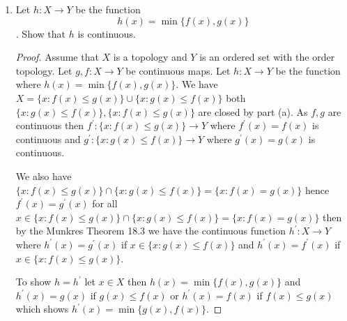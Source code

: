 \documentclass{amsart}
\theoremstyle{plain}
\theoremstyle{definition}
\theoremstyle{remark}
\begin{document}
\begin{enumerate}
\begin{proof}
\begin{enumerate}
            \[
                f^{-1}((g(x),f(x)])\cup g^{-1}((c,f(x)))\subset \{x:f(x)> g(x)\}
            \]
            \item If there is some $y\in Y$ where $f(x)>y> g(x)$ and without loss of generality $f(x)=\max (Y)$ and $g(x)\not =\min (Y)$ then we have the neighborhoods $f(x)\in (y, f(x)]$ and $g(x)\in (b,y)$ where $b\in Y$ with $b<g(x)$ then 
            \[
                f^{-1}((y,f(x)])\cup g^{-1}((b,y))\subset \{x:f(x)>g(x)\}
            \]
        
        \end{enumerate}
        Hence for all $x\in \{x: f(x)>g(x)\}$ we have the existence of two open sets $U,V$ in $Y$ with $x\in f^{-1}(U)\cup g^{-1}(V)\subset \{x: f(x)>g(x)\}$ then we get 
        \[
            \bigcup_{x\in \{x: f(x)>g(x)\}}f^{-1}(U_x)\cup g^{-1}(V_x)= \{x: f(x)>g(x)\}
        \]
        This implies that $\{x:f(x)>g(x)\}$ is open which implies that $\{x:f(x)\leq g(x)\}$ is closed. 
    \end{proof}


    \item Let $h:X\to Y$ be the function \[ h(x)=\min \{f(x),g(x)\}\]. Show that $h$ is continuous. 
    \begin{proof}
    Assume that $X$ is a topology and $Y$ is an ordered set with the order topology. Let $g,f:X\to Y$ be continuous maps. Let $h:X\to Y$ be the function where $h(x)=\min \{f(x),g(x)\}$. 
    We have $X=\{x:f(x)\leq g(x)\}\cup \{x: g(x)\leq f(x)\}$ both $\{x: g(x)\leq f(x)\},\{x:f(x)\leq g(x)\}$ are closed by part (a). As $f,g$ are continuous then $f^\prime:\{x:f(x)\leq g(x)\}\to Y $ where $f^\prime(x)=f(x)$ is continuous and $g^\prime :\{x: g(x)\leq f(x)\}\to Y$ where $g^{\prime}(x)=g(x)$ is continuous.
    
    We also have $\{x:f(x)\leq g(x)\}\cap \{x: g(x)\leq f(x)\}=\{x: f(x)=g(x)\}$ hence $f^\prime(x)=g^\prime(x)$ for all $x\in \{x:f(x)\leq g(x)\}\cap \{x: g(x)\leq f(x)\}=\{x: f(x)=g(x)\}$ then by the Munkres Theorem 18.3 we have the continuous function $h^\prime: X\to Y$ where $h^\prime(x)=g^\prime(x)$ if $x\in \{x: g(x)\leq f(x)\}$ and $h^\prime(x)=f^\prime(x)$ if $x\in \{x: f(x)\leq g(x)\}$. 

    To show $h=h^\prime$ let $x\in X$ then $h(x)=\min\{f(x),g(x)\}$ and $h^\prime(x)=g(x)$ if $g(x)\leq f(x)$ or $h^\prime (x)=f(x)$ if $f(x)\leq g(x)$ which shows $h^\prime(x) = \min \{g(x),f(x)\}$.
    \end{proof}
\end{enumerate}

 
\end{document}
